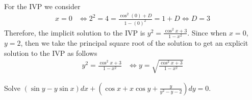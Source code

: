 \documentclass[notes.tex]{subfiles}
\begin{document}
\begin{solution}
\begin{align*}
    \end{align*}
    For the IVP we consider
    \begin{align*}
        x = 0
        &\iff 2^2 = 4 = \frac{\cos^2 (0) + D}{1 - (0)^2} = 1 + D
        \iff D = 3
    \end{align*}
    Therefore, the implicit solution to the IVP is $y^2 = \frac{\cos^2 x + 3}{1 - x^2}$.
    Since when $x = 0$, $y = 2$, then we take the principal square root of the solution to get an explicit solution to the IVP as follows
    \begin{align*}
        y^2 = \frac{\cos^2 x + 3}{1 - x^2}
        &\iff y = \sqrt{\frac{\cos^2 x + 3}{1 - x^2}}
    \end{align*}
\end{solution}

\begin{exercise}
    Solve $(\sin y - y\sin x)dx + \left(\cos x + x\cos y + \frac{y}{y^2 - y - 2}\right)dy = 0$.
\end{exercise}
\end{document}
